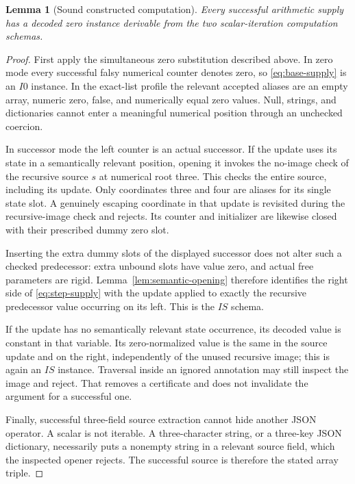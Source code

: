 \documentclass[11pt,letterpaper]{article}
\newtheorem{lemma}[theorem]{Lemma}
\theoremstyle{definition}
\begin{document}
\begin{lemma}[Sound constructed computation]
\label{lem:constructed-supply}
Every successful arithmetic supply has a decoded zero instance
derivable from the two scalar-iteration computation schemas.
\end{lemma}

\begin{proof}
First apply the simultaneous zero substitution described above.  In
zero mode every successful falsy numerical counter denotes zero, so
\eqref{eq:base-supply} is an $I0$ instance.  In the exact-list profile
the relevant accepted aliases are an empty array, numeric zero, false,
and numerically equal zero values.  Null, strings, and dictionaries
cannot enter a meaningful numerical position through an unchecked
coercion.

In successor mode the left counter is an actual successor.  If the
update uses its state in a semantically relevant position, opening it
invokes the no-image check of the recursive source $s$ at numerical
root three.  This checks the entire source, including its update.
Only coordinates three and four are aliases for its single state slot.
A genuinely escaping coordinate in that update is revisited during
the recursive-image check and rejects.  Its counter and initializer
are likewise closed with their prescribed dummy zero slot.

Inserting the extra dummy slots of the displayed successor does not
alter such a checked predecessor: extra unbound slots have value zero,
and actual free parameters are rigid.  Lemma~\ref{lem:semantic-opening}
therefore identifies the right side of \eqref{eq:step-supply} with the
update applied to exactly the recursive predecessor value occurring
on its left.  This is the $IS$ schema.

If the update has no semantically relevant state occurrence, its
decoded value is constant in that variable.  Its zero-normalized value
is the same in the source update and on the right, independently of
the unused recursive image; this is again an $IS$ instance.  Traversal
inside an ignored annotation may still inspect the image and reject.
That removes a certificate and does not invalidate the argument for a
successful one.

Finally, successful three-field source extraction cannot hide another
JSON operator.  A scalar is not iterable.  A three-character string,
or a three-key JSON dictionary, necessarily puts a nonempty string in
a relevant source field, which the inspected opener rejects.  The
successful source is therefore the stated array triple.
\end{proof}
\end{document}
